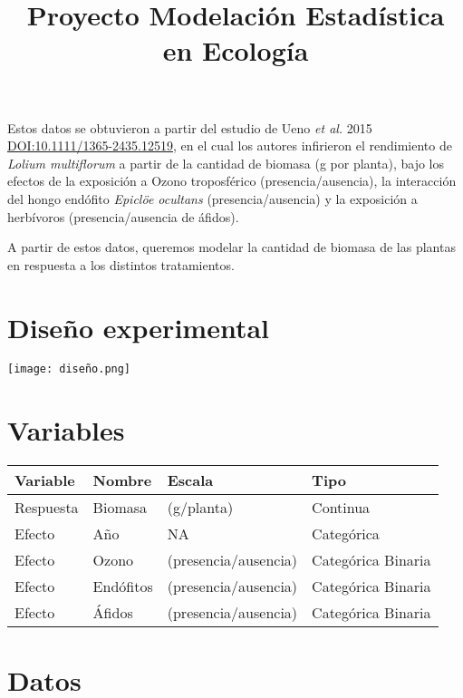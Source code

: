 \documentclass[
]{article}
\title{Proyecto Modelación Estadística en Ecología}
\author{}
\date{\vspace{-2.5em}}
\begin{document}
\maketitle

Estos datos se obtuvieron a partir del estudio de Ueno \emph{et al.}
2015
\href{https://doi.org/10.1111/1365-2435.12519}{DOI:10.1111/1365-2435.12519},
en el cual los autores infirieron el rendimiento de \emph{Lolium
multiflorum} a partir de la cantidad de biomasa (g por planta), bajo los
efectos de la exposición a Ozono troposférico (presencia/ausencia), la
interacción del hongo endófito \emph{Epiclöe ocultans}
(presencia/ausencia) y la exposición a herbívoros (presencia/ausencia de
áfidos).

A partir de estos datos, queremos modelar la cantidad de biomasa de las
plantas en respuesta a los distintos tratamientos.

\hypertarget{diseuxf1o-experimental}{%
\section{Diseño experimental}\label{diseuxf1o-experimental}}

\texttt{[image: diseño.png]}

\hypertarget{variables}{%
\section{Variables}\label{variables}}

\begin{longtable}[]{@{}llll@{}}
\toprule()
Variable & Nombre & Escala & Tipo \\
\midrule()
\endhead
Respuesta & Biomasa & (g/planta) & Continua \\
Efecto & Año & NA & Categórica \\
Efecto & Ozono & (presencia/ausencia) & Categórica Binaria \\
Efecto & Endófitos & (presencia/ausencia) & Categórica Binaria \\
Efecto & Áfidos & (presencia/ausencia) & Categórica Binaria \\
\bottomrule()
\end{longtable}

\hypertarget{datos}{%
\section{Datos}\label{datos}}
\end{document}
